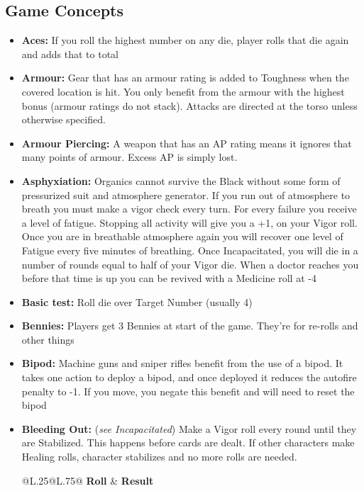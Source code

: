 \subsection{Game Concepts}
\begin{itemize}
  \item \textbf{Aces:} If you roll the highest number on any die, player rolls that die again and adds that to total
  \item \textbf{Armour:} Gear that has an armour rating is added to Toughness when the covered location is hit. You only benefit from the armour with the highest bonus (armour ratings do not stack). Attacks are directed at the torso unless otherwise specified.
  \item \textbf{Armour Piercing:} A weapon that has an AP rating means it ignores that many points of armour. Excess AP is simply lost.
  \item \textbf{Asphyxiation:} Organics cannot survive the Black without some form of pressurized suit and atmosphere generator. If you run out of atmosphere to breath you must make a vigor check every turn. For every failure you receive a level of fatigue. Stopping all activity will give you a +1, on your Vigor roll. Once you are in breathable atmosphere again you will recover one level of Fatigue every five minutes of breathing. Once Incapacitated, you will die in a number of rounds equal to half of your Vigor die. When a doctor reaches you before that time is up you can be revived with a Medicine roll at -4\\
  \item \textbf{Basic test:} Roll die over Target Number (usually 4)
  \item \textbf{Bennies:} Players get 3 Bennies at start of the game. They’re for re-rolls and other things
  \item \textbf{Bipod:} Machine guns and sniper rifles benefit from the use of a bipod. It takes one action to deploy a bipod, and once deployed it reduces the autofire penalty to -1. If you move, you negate this benefit and will need to reset the bipod
  \item \textbf{Bleeding Out:} (\textit{see Incapacitated}) Make a Vigor roll every round until they are Stabilized. This happens before cards are dealt. If other characters make Healing rolls, character stabilizes and no more rolls are needed.
    \begin{redtable}{\linewidth}{@{}L{.25}@{}L{.75}@{}}
      \textbf{Roll} & \textbf{Result}\\

\end{redtable}
\end{itemize}

